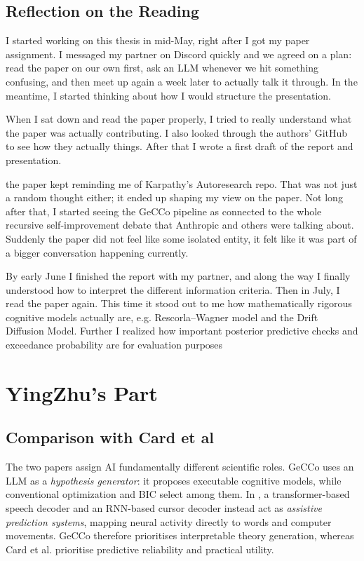 \subsection{Reflection on the Reading}

I started working on this thesis in mid-May, right after I got my paper assignment. I messaged my partner on Discord quickly and we agreed on a plan: read the paper on our own first, ask an LLM whenever we hit something confusing, and then meet up again a week later to actually talk it through. In the meantime, I started thinking about how I would structure the presentation.
 
When I sat down and read the paper properly, I tried to really understand what the paper was actually contributing. I also looked through the authors' GitHub to see how they actually  things. After that I wrote a first draft of the report and presentation.
 
the paper kept reminding me of Karpathy's Autoresearch repo. That was not just a random thought either; it ended up shaping my view on the paper. Not long after that, I started seeing the GeCCo pipeline as connected to the whole recursive self-improvement debate that Anthropic and others were talking about. Suddenly the paper did not feel like some isolated entity, it felt like it was part of a bigger conversation happening currently.
 
By early June I finished the report with my partner, and along the way I finally understood how to interpret the different information criteria. Then in July, I read the paper again. This time it stood out to me how mathematically rigorous  cognitive models actually are, e.g. Rescorla--Wagner model and the Drift Diffusion Model. Further I realized how important posterior predictive checks and exceedance probability are for evaluation purposes

\section{YingZhu's Part}
\subsection{Comparison with Card et al}
The two papers assign AI fundamentally different scientific roles. GeCCo uses an LLM as a \emph{hypothesis generator}: it proposes executable cognitive models, while conventional optimization and BIC select among them. In \citet{card2025longterm}, a transformer-based speech decoder and an RNN-based cursor decoder instead act as \emph{assistive prediction systems}, mapping neural activity directly to words and computer movements. GeCCo therefore prioritises interpretable theory generation, whereas Card et al. prioritise predictive reliability and practical utility.

